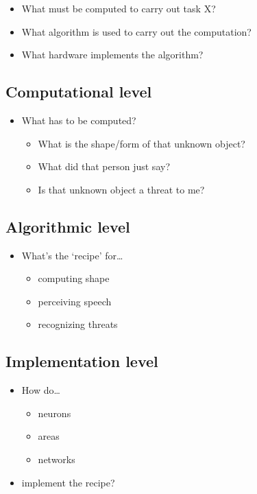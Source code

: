 \documentclass[
  letterpaper,
  DIV=11,
  numbers=noendperiod]{scrartcl}
\providecommand{\tightlist}{%
  \setlength{\itemsep}{0pt}\setlength{\parskip}{0pt}}\usepackage{longtable,booktabs,array}
\begin{document}
\begin{itemize}
\tightlist
\item
  What must be computed to carry out task X?
\item
  What algorithm is used to carry out the computation?
\item
  What hardware implements the algorithm?
\end{itemize}

\subsection{Computational level}\label{computational-level}

\begin{itemize}
\tightlist
\item
  What has to be computed?

  \begin{itemize}
  \tightlist
  \item
    What is the shape/form of that unknown object?
  \item
    What did that person just say?
  \item
    Is that unknown object a threat to me?
  \end{itemize}
\end{itemize}

\subsection{Algorithmic level}\label{algorithmic-level}

\begin{itemize}
\tightlist
\item
  What's the `recipe' for\ldots{}

  \begin{itemize}
  \tightlist
  \item
    computing shape
  \item
    perceiving speech
  \item
    recognizing threats
  \end{itemize}
\end{itemize}

\subsection{Implementation level}\label{implementation-level}

\begin{itemize}
\tightlist
\item
  How do\ldots{}

  \begin{itemize}
  \tightlist
  \item
    neurons
  \item
    areas
  \item
    networks
  \end{itemize}
\item
  implement the recipe?
\end{itemize}
\end{document}
